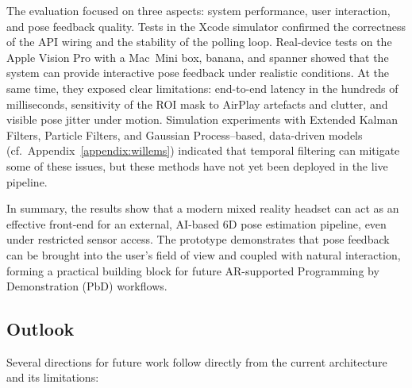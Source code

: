 The evaluation focused on three aspects: system performance, user interaction, and pose feedback quality. Tests in the Xcode simulator confirmed the correctness of the API wiring and the stability of the polling loop. Real-device tests on the Apple Vision Pro with a Mac~Mini box, banana, and spanner showed that the system can provide interactive pose feedback under realistic conditions. At the same time, they exposed clear limitations: end-to-end latency in the hundreds of milliseconds, sensitivity of the ROI mask to AirPlay artefacts and clutter, and visible pose jitter under motion. Simulation experiments with Extended Kalman Filters, Particle Filters, and Gaussian Process–based, data-driven models (cf.\ Appendix~\ref{appendix:willems}) indicated that temporal filtering can mitigate some of these issues, but these methods have not yet been deployed in the live pipeline.

In summary, the results show that a modern mixed reality headset can act as an effective front-end for an external, AI-based 6D pose estimation pipeline, even under restricted sensor access. The prototype demonstrates that pose feedback can be brought into the user’s field of view and coupled with natural interaction, forming a practical building block for future AR-supported Programming by Demonstration (PbD) workflows.

\subsection{Outlook}

Several directions for future work follow directly from the current architecture and its limitations:

